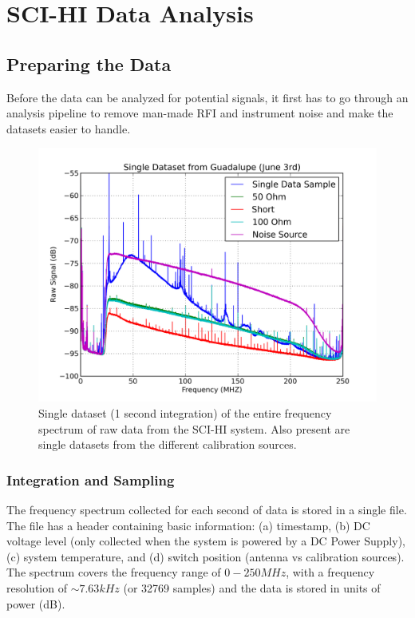 \chapter{SCI-HI Data Analysis}\label{Ch:Data}



\section{Preparing the Data}

Before the data can be analyzed for potential signals, it first has to go through an analysis pipeline to remove man-made RFI and instrument noise and make the datasets easier to handle. 

\begin{figure}[htb]
\begin{center}
\includegraphics[width=0.88\linewidth]{Data_analysis/figures/single_raw_guad_june03.png}
\caption{Single dataset (1 second integration) of the entire frequency spectrum of raw data from the SCI-HI system. Also present are single datasets from the different calibration sources. }
\label{Fig:raw_data}
\end{center}
\end{figure}


\subsection{Integration and Sampling}\label{Sec:int}

The frequency spectrum collected for each second of data is stored in a single file. The file has a header containing basic information: (a) timestamp, (b) DC voltage level (only collected when the system is powered by a DC Power Supply), (c) system temperature, and (d) switch position (antenna vs calibration sources). The spectrum covers the frequency range of $0-250 MHz$, with a frequency resolution of $\sim 7.63 kHz$ (or 32769 samples) and the data is stored in units of power (dB).

